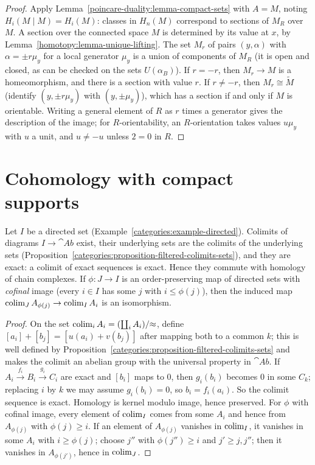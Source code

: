 \begin{proof}
Apply Lemma~\ref{poincare-duality:lemma-compact-sets} with $A = M$, noting $H_i(M \mid M) = H_i(M)$: classes in $H_n(M)$ correspond to sections of $M_R$ over $M$. A section
over the connected space $M$ is determined by its value at $x$, by Lemma~\ref{homotopy:lemma-unique-lifting}. The set $M_r$ of pairs $(y, \alpha)$ with $\alpha = \pm r\mu_y$
for a local generator $\mu_y$ is a union of components of $M_R$ (it is open and closed, as can be checked on the sets $U(\alpha_B)$). If $r = -r$, then $M_r \to M$ is a
homeomorphism, and there is a section with value $r$. If $r \neq -r$, then $M_r \cong \tilde{M}$ (identify $(y, \pm r\mu_y)$ with $(y, \pm\mu_y)$), which has a section if and only
if $M$ is orientable. Writing a general element of $R$ as $r$ times a generator gives the description of the image; for $R$-orientability, an $R$-orientation takes values
$u\mu_y$ with $u$ a unit, and $u \neq -u$ unless $2 = 0$ in $R$.
\end{proof}

\section{Cohomology with compact supports}\label{poincare-duality:section-compact-supports}

\begin{lemma}\label{poincare-duality:lemma-directed-colimits}
Let $I$ be a directed set (Example~\ref{categories:example-directed}). Colimits of diagrams $I \to \cat{Ab}$ exist, their underlying sets are the colimits of the
underlying sets (Proposition~\ref{categories:proposition-filtered-colimits-sets}), and they are exact: a colimit of exact sequences is exact. Hence they commute with
homology of chain complexes. If $\phi \colon J \to I$ is an order-preserving map of directed sets with \emph{cofinal} image (every $i \in I$ has some $j$ with $i \leq \phi(j)$),
then the induced map $\operatorname*{colim}_J A_{\phi(j)} \to \operatorname*{colim}_I A_i$ is an isomorphism.
\end{lemma}

\begin{proof}
On the set $\operatorname*{colim}_i A_i = (\coprod_i A_i)/{\approx}$, define $[a_i] + [b_j] = [u(a_i) + v(b_j)]$ after mapping both to a common $k$; this is well defined by
Proposition~\ref{categories:proposition-filtered-colimits-sets} and makes the colimit an abelian group with the universal property in $\cat{Ab}$. If
$A_i \xrightarrow{f_i} B_i \xrightarrow{g_i} C_i$ are exact and $[b_i]$ maps to $0$, then $g_i(b_i)$ becomes $0$ in some $C_k$; replacing $i$ by $k$ we may assume $g_i(b_i) = 0$,
so $b_i = f_i(a_i)$. So the colimit sequence is exact. Homology is kernel modulo image, hence preserved. For $\phi$ with cofinal image, every element of $\operatorname*{colim}_I$ comes from some
$A_i$ and hence from $A_{\phi(j)}$ with $\phi(j) \geq i$. If an element of $A_{\phi(j)}$ vanishes in $\operatorname*{colim}_I$, it vanishes in some $A_i$ with $i \geq \phi(j)$; choose $j''$ with
$\phi(j'') \geq i$ and $j' \geq j, j''$; then it vanishes in $A_{\phi(j')}$, hence in $\operatorname*{colim}_J$.
\end{proof}

